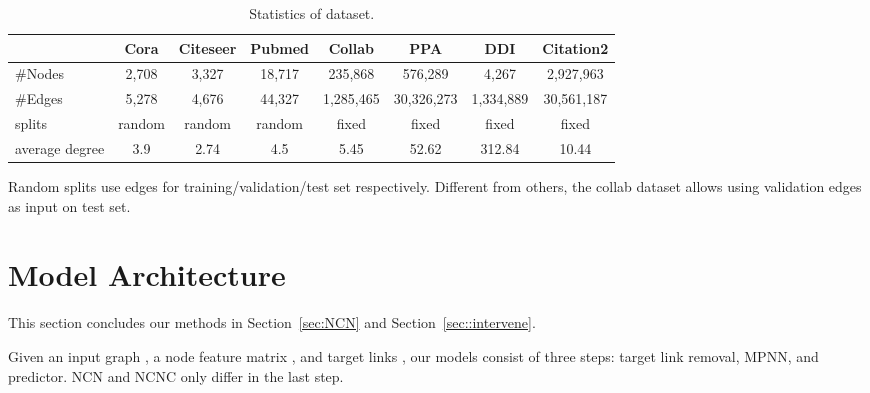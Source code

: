 \documentclass{article}
\theoremstyle{plain}
\theoremstyle{definition}
\theoremstyle{remark}
\begin{document}
\begin{table*}[h]
    \centering
    \caption{Statistics of dataset.}\label{tab:datasets}
    \vskip 0.15in
    \begin{tabular}{l ccccccc}
    \toprule 
         &
         \textbf{Cora} &  
         \textbf{Citeseer} & 
         \textbf{Pubmed} &
         \textbf{Collab} &
         \textbf{PPA} &
         \textbf{DDI} &
         \textbf{Citation2}
        \\
\midrule
         
                  \#Nodes &

         2,708 & 
         3,327 &
         18,717 &
         235,868 &
         576,289 &
         4,267 &
         2,927,963
          \\
         
         \#Edges &
         5,278 & 
         4,676 &
         44,327 &
         1,285,465 &
         30,326,273 &
         1,334,889 &
         30,561,187
          \\

         splits &

         random &
         random & 
         random &
         fixed &
         fixed &
         fixed &
         fixed \\
          
         average degree &
         3.9 &
         2.74 & 
         4.5 &
         5.45 &
         52.62 &
         312.84 &
         10.44
        \\
         
         \bottomrule
\end{tabular}

\label{tab:subgraph properties}
\end{table*}
Random splits use  edges for training/validation/test set respectively. Different from others, the collab dataset allows using validation edges as input on test set. 

\section{Model Architecture}\label{app:arch}

This section concludes our methods in Section~\ref{sec:NCN} and Section~\ref{sec::intervene}.

Given an input graph , a node feature matrix , and target links , our models consist of three steps: target link removal, MPNN, and predictor. NCN and NCNC only differ in the last step.
\end{document}
